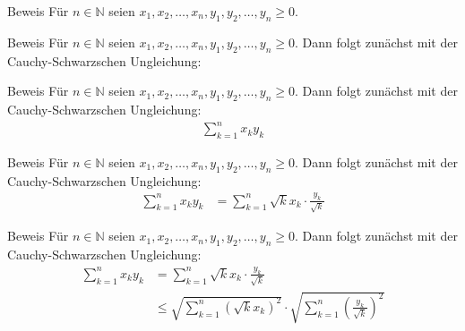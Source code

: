 \documentclass[10pt]{beamer}
\def\bN{\mathbb{N}}
\begin{document}
\begin{frame}{Beweis}
    Für \( n \in \bN \) seien \( x_{1}, x_{2}, \ldots, x_{n}, y_{1}, y_{2}, \ldots, y_{n} \geq 0 \).
\end{frame}



\begin{frame}{Beweis}
    Für \( n \in \bN \) seien \( x_{1}, x_{2}, \ldots, x_{n}, y_{1}, y_{2}, \ldots, y_{n} \geq 0 \). Dann folgt zunächst mit der Cauchy-Schwarzschen Ungleichung:
\end{frame}



\begin{frame}{Beweis}
    Für \( n \in \bN \) seien \( x_{1}, x_{2}, \ldots, x_{n}, y_{1}, y_{2}, \ldots, y_{n} \geq 0 \). Dann folgt zunächst mit der Cauchy-Schwarzschen Ungleichung:
    \begin{align*}
        \sum_{k = 1}^{n} x_{k} y_{k}
    \end{align*}
\end{frame}



\begin{frame}{Beweis}
    Für \( n \in \bN \) seien \( x_{1}, x_{2}, \ldots, x_{n}, y_{1}, y_{2}, \ldots, y_{n} \geq 0 \). Dann folgt zunächst mit der Cauchy-Schwarzschen Ungleichung:
    \begin{align*}
        \sum_{k = 1}^{n} x_{k} y_{k}
        & = \sum_{k = 1}^{n} \sqrt{k}x_{k} \cdot \frac{y_{k}}{\sqrt{k}}
    \end{align*}
\end{frame}



\begin{frame}{Beweis}
    Für \( n \in \bN \) seien \( x_{1}, x_{2}, \ldots, x_{n}, y_{1}, y_{2}, \ldots, y_{n} \geq 0 \). Dann folgt zunächst mit der Cauchy-Schwarzschen Ungleichung:
    \begin{align*}
        \sum_{k = 1}^{n} x_{k} y_{k}
        & = \sum_{k = 1}^{n} \sqrt{k}x_{k} \cdot \frac{y_{k}}{\sqrt{k}} \\
        & \leq \sqrt{\sum_{k = 1}^{n} \left( \sqrt{k}x_{k} \right)^{2}} \cdot \sqrt{\sum_{k = 1}^{n} \left( \frac{y_{k}}{\sqrt{k}} \right)^{2}}
    \end{align*}
\end{frame}
\end{document}
